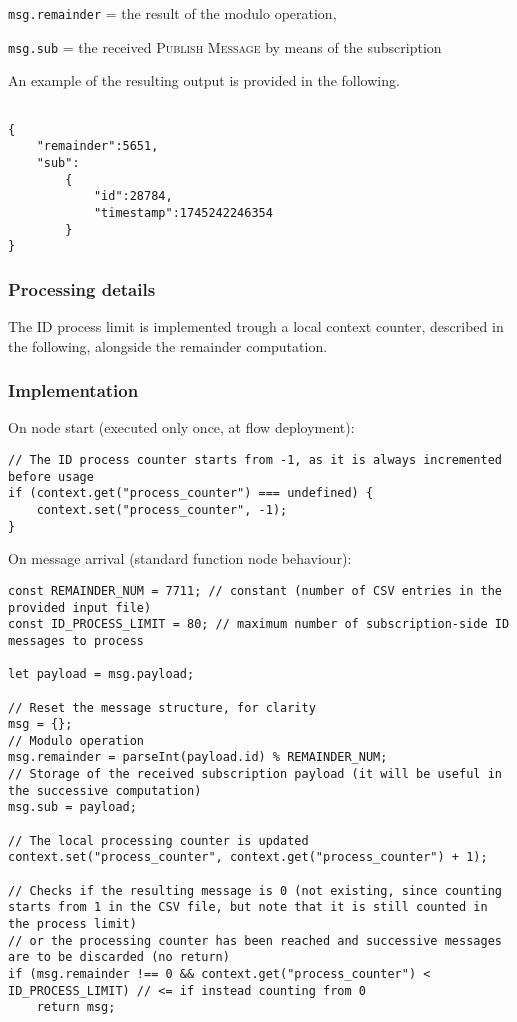 \documentclass[a4paper,11pt]{article} %
\begin{document}
    \smallskip

    \texttt{msg.remainder} = the result of the modulo operation,

    \texttt{msg.sub} = the received \textsc{Publish Message} by means of the subscription

    \medskip

    An example of the resulting output is provided in the following.

    \begin{verbatim}

{
    "remainder":5651,
    "sub":
        {
            "id":28784,
            "timestamp":1745242246354
        }
}
    \end{verbatim}

    \subsubsection{Processing details}

    The ID process limit is implemented trough a local context counter, described in the following, alongside the remainder computation.

    \subsubsection{Implementation}

    On node start (executed only once, at flow deployment):

    \begin{verbatim}
// The ID process counter starts from -1, as it is always incremented before usage
if (context.get("process_counter") === undefined) {
    context.set("process_counter", -1);
}
    \end{verbatim}

    On message arrival (standard function node behaviour):

    \begin{verbatim}
const REMAINDER_NUM = 7711; // constant (number of CSV entries in the provided input file)
const ID_PROCESS_LIMIT = 80; // maximum number of subscription-side ID messages to process

let payload = msg.payload;

// Reset the message structure, for clarity
msg = {};
// Modulo operation
msg.remainder = parseInt(payload.id) % REMAINDER_NUM;
// Storage of the received subscription payload (it will be useful in the successive computation)
msg.sub = payload;

// The local processing counter is updated
context.set("process_counter", context.get("process_counter") + 1);

// Checks if the resulting message is 0 (not existing, since counting starts from 1 in the CSV file, but note that it is still counted in the process limit)
// or the processing counter has been reached and successive messages are to be discarded (no return)
if (msg.remainder !== 0 && context.get("process_counter") < ID_PROCESS_LIMIT) // <= if instead counting from 0
    return msg;
    \end{verbatim}
\end{document}
